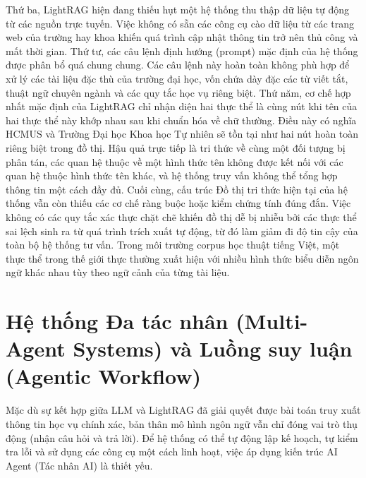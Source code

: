Thứ ba, LightRAG hiện đang thiếu hụt một hệ thống thu thập dữ liệu tự động từ các nguồn trực tuyến. Việc không có sẵn các công cụ cào dữ liệu từ các trang web của trường hay khoa khiến quá trình cập nhật thông tin trở nên thủ công và mất thời gian. Thứ tư, các câu lệnh định hướng (prompt) mặc định của hệ thống được phân bổ quá chung chung. Các câu lệnh này hoàn toàn không phù hợp để xử lý các tài liệu đặc thù của trường đại học, vốn chứa dày đặc các từ viết tắt, thuật ngữ chuyên ngành và các quy tắc học vụ riêng biệt.  Thứ năm, 
cơ chế hợp nhất mặc định của LightRAG chỉ nhận diện hai thực thể là
cùng nút khi tên của hai thực thể này khớp nhau sau khi chuẩn hóa về chữ thường.
Điều này có nghĩa HCMUS và Trường Đại học Khoa học
Tự nhiên sẽ tồn tại như hai nút hoàn toàn riêng biệt trong đồ thị.
Hậu quả trực tiếp là tri thức về cùng một đối tượng bị phân tán, các
quan hệ thuộc về một hình thức tên không được kết nối với các quan hệ
thuộc hình thức tên khác, và hệ thống truy vấn không thể tổng hợp thông
tin một cách đầy đủ. Cuối cùng, cấu trúc Đồ thị tri thức hiện tại của hệ thống vẫn còn thiếu các cơ chế ràng buộc hoặc kiểm chứng tính đúng đắn. Việc không có các quy tắc xác thực chặt chẽ khiến đồ thị dễ bị nhiễu bởi các thực thể sai lệch sinh ra từ quá trình trích xuất tự động, từ đó làm giảm đi độ tin cậy của toàn bộ hệ thống tư vấn.
Trong môi trường corpus học thuật tiếng Việt, một thực thể trong thế
giới thực thường xuất hiện với nhiều hình thức biểu diễn ngôn ngữ khác
nhau tùy theo ngữ cảnh của từng tài liệu. 


\section{Hệ thống Đa tác nhân (Multi-Agent Systems) và Luồng suy luận (Agentic Workflow)}
Mặc dù sự kết hợp giữa LLM và LightRAG đã giải quyết được bài toán truy xuất thông tin học vụ chính xác, bản thân mô hình ngôn ngữ vẫn chỉ đóng vai trò thụ động (nhận câu hỏi và trả lời). Để hệ thống có thể tự động lập kế hoạch, tự kiểm tra lỗi và sử dụng các công cụ một cách linh hoạt, việc áp dụng kiến trúc AI Agent (Tác nhân AI) là thiết yếu.

